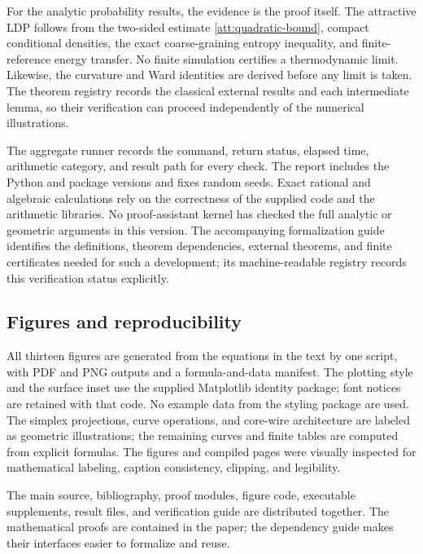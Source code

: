 For the analytic probability results, the evidence is the proof itself.
The attractive LDP follows from the two-sided estimate
\eqref{att:quadratic-bound}, compact conditional densities, the exact
coarse-graining entropy inequality, and finite-reference energy transfer.
No finite simulation certifies a thermodynamic limit. Likewise, the
curvature and Ward identities are derived before any limit is taken.
The theorem registry records the classical external results and each
intermediate lemma, so their verification can proceed independently of
the numerical illustrations.

The aggregate runner records the command, return status, elapsed time,
arithmetic category, and result path for every check. The report includes
the Python and package versions and fixes random seeds. Exact rational
and algebraic calculations rely on the correctness of the supplied code
and the arithmetic libraries. No proof-assistant kernel has checked the
full analytic or geometric arguments in this version. The accompanying
formalization guide identifies the definitions, theorem dependencies,
external theorems, and finite certificates needed for such a development;
its machine-readable registry records this verification status explicitly.

\subsection{Figures and reproducibility}

All thirteen figures are generated from the equations in the text by one
script, with PDF and PNG outputs and a formula-and-data manifest. The
plotting style and the surface inset use the supplied Matplotlib identity
package; font notices are retained with that code. No example data from
the styling package are used. The simplex projections, curve operations,
and core-wire architecture are labeled as geometric illustrations; the
remaining curves and finite tables are computed from explicit formulas.
The figures and compiled pages were visually inspected for mathematical
labeling, caption consistency, clipping, and legibility.

The main source, bibliography, proof modules, figure code, executable
supplements, result files, and verification guide are distributed together.
The mathematical proofs are contained in the paper; the dependency guide
makes their interfaces easier to formalize and reuse.
